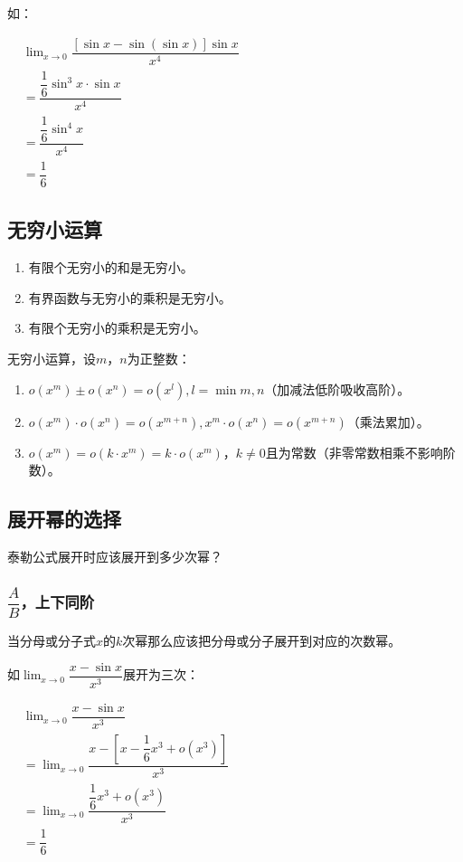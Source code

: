 \documentclass[UTF8]{ctexart}
\begin{document}
如：

$
\begin{aligned}
    & \lim_{x\to 0}\dfrac{[\sin x-\sin(\sin x)]\sin x}{x^4} \\
    & =\dfrac{\dfrac{1}{6}\sin^3x\cdot\sin x}{x^4} \\
    & =\dfrac{\dfrac{1}{6}\sin^4x}{x^4} \\
    & =\dfrac{1}{6}
\end{aligned}
$

\subsection{无穷小运算}

\begin{enumerate}
    \item 有限个无穷小的和是无穷小。
    \item 有界函数与无穷小的乘积是无穷小。
    \item 有限个无穷小的乘积是无穷小。
\end{enumerate}

无穷小运算，设$m$，$n$为正整数：

\begin{enumerate}
    \item $o(x^m)\pm o(x^n)=o(x^l),l=\min{m,n}$（加减法低阶吸收高阶）。
    \item $o(x^m)\cdot o(x^n)=o(x^{m+n}),x^m\cdot o(x^n)=o(x^{m+n})$（乘法累加）。
    \item $o(x^m)=o(k\cdot x^m)=k\cdot o(x^m)$，$k\neq 0$且为常数（非零常数相乘不影响阶数）。
\end{enumerate}

\subsection{展开幂的选择}

泰勒公式展开时应该展开到多少次幂？

\subsubsection{\texorpdfstring{$\dfrac{A}{B}$}型，上下同阶}

当分母或分子式$x$的$k$次幂那么应该把分母或分子展开到对应的次数幂。

如$\lim_{x\to 0}\dfrac{x-\sin x}{x^3}$展开为三次：

$
\begin{aligned}
    & \lim_{x\to 0}\dfrac{x-\sin x}{x^3} \\
    & =\lim_{x\to 0}\dfrac{x-\left[x-\dfrac{1}{6}x^3+o(x^3)\right]}{x^3} \\
    & =\lim_{x\to 0}\dfrac{\dfrac{1}{6}x^3+o(x^3)}{x^3} \\
    & =\dfrac{1}{6}
\end{aligned}
$
\end{document}

